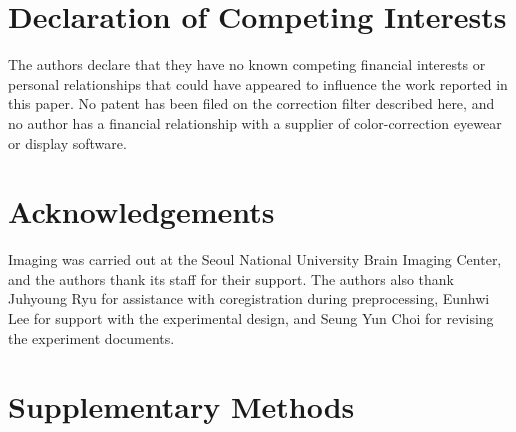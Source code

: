 \documentclass{imag-ms-template}
\begin{document}
\section*{Declaration of Competing Interests}

The authors declare that they have no known competing financial interests or
personal relationships that could have appeared to influence the work reported
in this paper. No patent has been filed on the correction filter described here,
and no author has a financial relationship with a supplier of color-correction
eyewear or display software.

\section*{Acknowledgements}

Imaging was carried out at the Seoul National University Brain Imaging Center,
and the authors thank its staff for their support. The authors also thank
Juhyoung Ryu for assistance with coregistration during preprocessing, Eunhwi Lee
for support with the experimental design, and Seung Yun Choi for revising the
experiment documents.


\printbibliography




\clearpage
\section*{Supplementary Methods}

\end{document}
